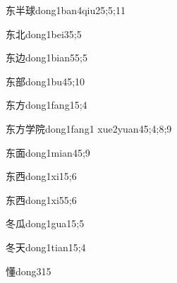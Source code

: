 \begin{verbete}{东半球}{dong1ban4qiu2}{5;5;11}
\end{verbete}

\begin{verbete}{东北}{dong1bei3}{5;5}
\end{verbete}

\begin{verbete}{东边}{dong1bian5}{5;5}
\end{verbete}

\begin{verbete}{东部}{dong1bu4}{5;10}
\end{verbete}

\begin{verbete}{东方}{dong1fang1}{5;4}
\end{verbete}

\begin{verbete}{东方学院}{dong1fang1 xue2yuan4}{5;4;8;9}
\end{verbete}

\begin{verbete}{东面}{dong1mian4}{5;9}
\end{verbete}

\begin{verbete}{东西}{dong1xi1}{5;6}
\end{verbete}

\begin{verbete}{东西}{dong1xi5}{5;6}
\end{verbete}

\begin{verbete}{冬瓜}{dong1gua1}{5;5}
\end{verbete}

\begin{verbete}{冬天}{dong1tian1}{5;4}
\end{verbete}

\begin{verbete}{懂}{dong3}{15}
\end{verbete}

